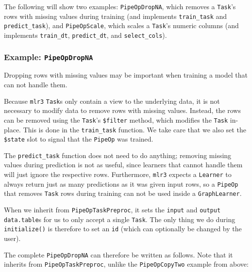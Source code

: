 \documentclass[12pt,]{scrbook}
\begin{document}
The following will show two examples: \texttt{PipeOpDropNA}, which removes a \texttt{Task}'s rows with missing values during training (and implements \texttt{train\_task} and \texttt{predict\_task}), and \texttt{PipeOpScale}, which scales a \texttt{Task}'s numeric columns (and implements \texttt{train\_dt}, \texttt{predict\_dt}, and \texttt{select\_cols}).

\hypertarget{example-pipeopdropna}{%
\subsubsection{\texorpdfstring{Example: \texttt{PipeOpDropNA}}{Example: PipeOpDropNA}}\label{example-pipeopdropna}}

Dropping rows with missing values may be important when training a model that can not handle them.

Because \texttt{mlr3} \texttt{Task}s only contain a view to the underlying data, it is not necessary to modify data to remove rows with missing values.
Instead, the rows can be removed using the \texttt{Task}'s \texttt{\$filter} method, which modifies the \texttt{Task} in-place.
This is done in the \texttt{train\_task} function. We take care that we also set the \texttt{\$state} slot to signal that the \texttt{PipeOp} was trained.

The \texttt{predict\_task} function does not need to do anything; removing missing values during prediction is not as useful, since learners that cannot handle them will just ignore the respective rows.
Furthermore, \texttt{mlr3} expects a \texttt{Learner} to always return just as many predictions as it was given input rows, so a \texttt{PipeOp} that removes \texttt{Task} rows during training can not be used inside a \texttt{GraphLearner}.

When we inherit from \texttt{PipeOpTaskPreproc}, it sets the \texttt{input} and \texttt{output} \texttt{data.table}s for us to only accept a single \texttt{Task}.
The only thing we do during \texttt{initialize()} is therefore to set an \texttt{id} (which can optionally be changed by the user).

The complete \texttt{PipeOpDropNA} can therefore be written as follows.
Note that it inherits from \texttt{PipeOpTaskPreproc}, unlike the \texttt{PipeOpCopyTwo} example from above:
\end{document}
